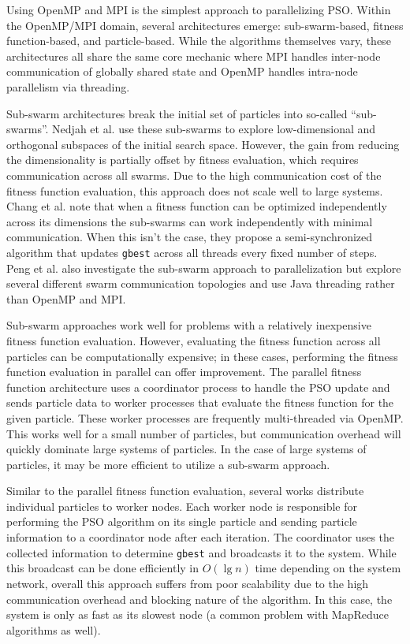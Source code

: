Using OpenMP and MPI is the simplest approach to parallelizing PSO. Within the
OpenMP/MPI domain, several architectures emerge: sub-swarm-based, fitness
function-based, and particle-based. While the algorithms themselves vary, these
architectures all share the same core mechanic where MPI handles inter-node
communication of globally shared state and OpenMP handles intra-node parallelism
via threading.

Sub-swarm architectures break the initial set of particles into so-called
``sub-swarms''. Nedjah et al. \cite{comppso} use these sub-swarms to explore
low-dimensional and orthogonal subspaces of the initial search space. However,
the gain from reducing the dimensionality is partially offset by fitness
evaluation, which requires communication across all swarms. Due to the high
communication cost of the fitness function evaluation, this approach does not
scale well to large systems. Chang et al. \cite{ppso} note that when a fitness
function can be optimized independently across its dimensions the sub-swarms can
work independently with minimal communication. When this isn't the case, they
propose a semi-synchronized algorithm that updates \texttt{gbest} across all
threads every fixed number of steps. Peng et al. \cite{multicore-pso} also
investigate the sub-swarm approach to
parallelization but explore several different swarm communication topologies and
use Java threading rather than OpenMP and MPI.

Sub-swarm approaches work well for problems with a relatively inexpensive
fitness function evaluation. However, evaluating the fitness function across all
particles can be computationally expensive; in these cases, performing the
fitness function evaluation in parallel can offer improvement. The parallel
fitness function architecture \cite{pgpso, ppso-fd} uses a coordinator process
to handle the PSO update and sends particle data to worker processes that
evaluate the fitness function for the given particle. These worker processes are
frequently multi-threaded via OpenMP.
This works well for a small number of particles, but communication
overhead will quickly dominate large systems of particles. In the case of large
systems of particles, it may be more efficient to utilize a sub-swarm approach.

Similar to the parallel fitness function evaluation, several works
\cite{cooppso, optionpso} distribute individual particles to worker nodes. Each
worker node is responsible for performing the PSO algorithm on its single
particle and sending particle information to a coordinator node after each
iteration. The coordinator uses the collected information to determine
\texttt{gbest} and broadcasts it to the system. While this broadcast can be done
efficiently in $O(\lg n)$ time depending on the system network, overall this
approach suffers from poor scalability due to the high communication overhead
and blocking nature of the algorithm. In this case, the system is only as fast
as its slowest node (a common problem with MapReduce algorithms as well).

